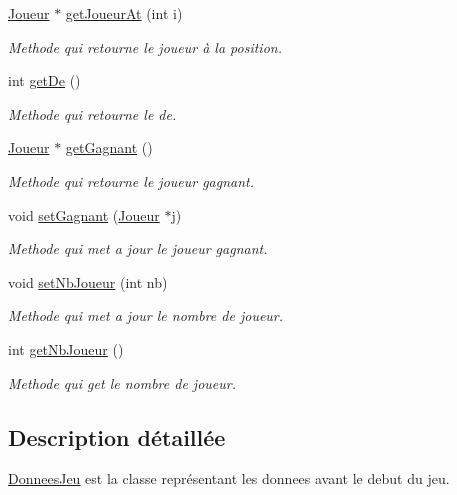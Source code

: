 \begin{DoxyCompactItemize}
\hyperlink{classJoueur}{\-Joueur} $\ast$ \hyperlink{classDonneesJeu_a94ac64e9b0a6ec3e10a2589bb90830e4}{get\-Joueur\-At} (int i)
\begin{DoxyCompactList}\small\item\em \-Methode qui retourne le joueur à la position. \end{DoxyCompactList}\item 
int \hyperlink{classDonneesJeu_a9d66541ae27e731bcd4fca1a82b8c94f}{get\-De} ()
\begin{DoxyCompactList}\small\item\em \-Methode qui retourne le de. \end{DoxyCompactList}\item 
\hyperlink{classJoueur}{\-Joueur} $\ast$ \hyperlink{classDonneesJeu_a1f9959f0eae2138deb88422671c6a1f2}{get\-Gagnant} ()
\begin{DoxyCompactList}\small\item\em \-Methode qui retourne le joueur gagnant. \end{DoxyCompactList}\item 
void \hyperlink{classDonneesJeu_a2b7a86ddb0732fe79afa5f4ad71af9d2}{set\-Gagnant} (\hyperlink{classJoueur}{\-Joueur} $\ast$j)
\begin{DoxyCompactList}\small\item\em \-Methode qui met a jour le joueur gagnant. \end{DoxyCompactList}\item 
void \hyperlink{classDonneesJeu_a1da6b561395378b12e3331cb61d1a6ad}{set\-Nb\-Joueur} (int nb)
\begin{DoxyCompactList}\small\item\em \-Methode qui met a jour le nombre de joueur. \end{DoxyCompactList}\item 
int \hyperlink{classDonneesJeu_a7b698e7aea2dd33cf744b5532c59eb1f}{get\-Nb\-Joueur} ()
\begin{DoxyCompactList}\small\item\em \-Methode qui get le nombre de joueur. \end{DoxyCompactList}\end{DoxyCompactItemize}


\subsection{\-Description détaillée}
\hyperlink{classDonneesJeu}{\-Donnees\-Jeu} est la classe représentant les donnees avant le debut du jeu. 


